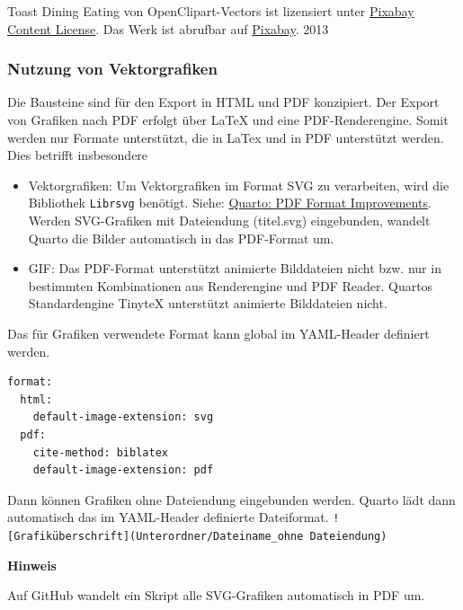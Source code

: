 \documentclass[
  letterpaper,
  DIV=11]{scrartcl}
\begin{document}
Toast Dining Eating von OpenClipart-Vectors ist lizensiert unter
\href{https://pixabay.com/service/license-summary/}{Pixabay Content
License}. Das Werk ist abrufbar auf
\href{https://pixabay.com/vectors/toast-dining-eating-event-festive-153723/}{Pixabay}.
2013

\subsubsection{Nutzung von
Vektorgrafiken}\label{nutzung-von-vektorgrafiken}

Die Bausteine sind für den Export in HTML und PDF konzipiert. Der Export
von Grafiken nach PDF erfolgt über LaTeX und eine PDF-Renderengine.
Somit werden nur Formate unterstützt, die in LaTex und in PDF
unterstützt werden. Dies betrifft insbesondere

\begin{itemize}
\item
  Vektorgrafiken: Um Vektorgrafiken im Format SVG zu verarbeiten, wird
  die Bibliothek \texttt{Librsvg} benötigt. Siehe:
  \href{https://quarto.org/docs/prerelease/1.3/pdf.html}{Quarto: PDF
  Format Improvements}. Werden SVG-Grafiken mit Dateiendung (titel.svg)
  eingebunden, wandelt Quarto die Bilder automatisch in das PDF-Format
  um.
\item
  GIF: Das PDF-Format unterstützt animierte Bilddateien nicht bzw. nur
  in bestimmten Kombinationen aus Renderengine und PDF Reader. Quartos
  Standardengine TinyteX unterstützt animierte Bilddateien nicht.
\end{itemize}

Das für Grafiken verwendete Format kann global im YAML-Header definiert
werden.

\begin{verbatim}
format:
  html:
    default-image-extension: svg
  pdf:
    cite-method: biblatex
    default-image-extension: pdf
\end{verbatim}

Dann können Grafiken ohne Dateiendung eingebunden werden. Quarto lädt
dann automatisch das im YAML-Header definierte Dateiformat.
\texttt{!{[}Grafiküberschrift{]}(Unterordner/Dateiname\_ohne\ Dateiendung)}

\begin{tcolorbox}[enhanced jigsaw, opacityback=0, rightrule=.15mm, leftrule=.75mm, left=2mm, colback=white, bottomrule=.15mm, colframe=quarto-callout-warning-color-frame, breakable, toprule=.15mm, arc=.35mm]
\begin{minipage}[t]{5.5mm}
\textcolor{quarto-callout-warning-color}{\faExclamationTriangle}
\end{minipage}%
\begin{minipage}[t]{\textwidth - 5.5mm}

\vspace{-3mm}\textbf{Hinweis}\vspace{3mm}

Auf GitHub wandelt ein Skript alle SVG-Grafiken automatisch in PDF um.

\end{minipage}%
\end{tcolorbox}
\end{document}
